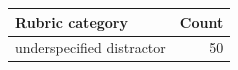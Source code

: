 \begin{tabular}{lr}
\toprule
Rubric category & Count \\
\midrule
underspecified distractor & 50 \\
\bottomrule
\end{tabular}
